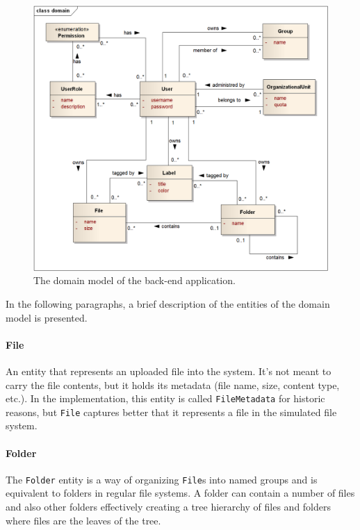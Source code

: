 \documentclass{book}
\begin{document}
\begin{figure}[h!]
\begin{center}
\includegraphics[width=0.98\columnwidth]{figures/domain/domain}
\caption{The domain model of the back-end application.%
}
\end{center}
\end{figure}

In the following paragraphs, a brief description of the entities of the
domain model is presented.

\paragraph{File}\label{file}

An entity that represents an uploaded file into the system. It's not
meant to carry the file contents, but it holds its metadata (file name,
size, content type, etc.). In the implementation, this entity is called
\texttt{FileMetadata} for historic reasons, but \texttt{File} captures
better that it represents a file in the simulated file system.

\paragraph{Folder}\label{folder}

The \texttt{Folder} entity is a way of organizing \texttt{File}s into
named groups and is equivalent to folders in regular file systems. A
folder can contain a number of files and also other folders effectively
creating a tree hierarchy of files and folders where files are the
leaves of the tree.
\end{document}

